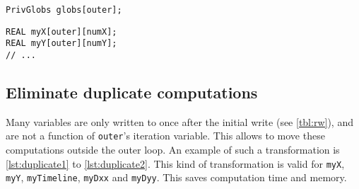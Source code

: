 \documentclass[a4paper]{article}
\begin{document}
\begin{lstlisting}[caption={An array of \texttt{PrivGlobs}.},label={lst:vector1}]
PrivGlobs globs[outer];
\end{lstlisting}
\begin{lstlisting}[caption={Expanding the struct.},label={lst:vector2}]
REAL myX[outer][numX];
REAL myY[outer][numY];
// ...
\end{lstlisting}

\subsection{Eliminate duplicate computations}

Many variables are only written to once after the initial write (see
\autoref{tbl:rw}), and are not a function of \texttt{outer}'s iteration
variable. This allows to move these computations outside the outer loop. An
example of such a transformation is \autoref{lst:duplicate1} to
\autoref{lst:duplicate2}. This kind of transformation is valid for
\texttt{myX}, \texttt{myY}, \texttt{myTimeline}, \texttt{myDxx} and
\texttt{myDyy}. This saves computation time and memory.
\end{document}
